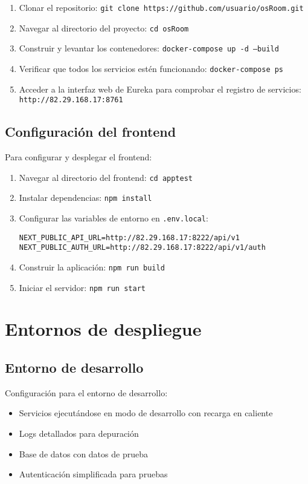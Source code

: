 \documentclass[12pt,a4paper]{report}
\begin{document}
\begin{enumerate}
    \item Clonar el repositorio: \texttt{git clone https://github.com/usuario/osRoom.git}
    \item Navegar al directorio del proyecto: \texttt{cd osRoom}
    \item Construir y levantar los contenedores: \texttt{docker-compose up -d --build}
    \item Verificar que todos los servicios estén funcionando: \texttt{docker-compose ps}
    \item Acceder a la interfaz web de Eureka para comprobar el registro de servicios: \texttt{http://82.29.168.17:8761}
\end{enumerate}

\subsection{Configuración del frontend}
Para configurar y desplegar el frontend:

\begin{enumerate}
    \item Navegar al directorio del frontend: \texttt{cd apptest}
    \item Instalar dependencias: \texttt{npm install}
    \item Configurar las variables de entorno en \texttt{.env.local}:
    \begin{lstlisting}
NEXT_PUBLIC_API_URL=http://82.29.168.17:8222/api/v1
NEXT_PUBLIC_AUTH_URL=http://82.29.168.17:8222/api/v1/auth
    \end{lstlisting}
    \item Construir la aplicación: \texttt{npm run build}
    \item Iniciar el servidor: \texttt{npm run start}
\end{enumerate}

\section{Entornos de despliegue}
\subsection{Entorno de desarrollo}
Configuración para el entorno de desarrollo:

\begin{itemize}
    \item Servicios ejecutándose en modo de desarrollo con recarga en caliente
    \item Logs detallados para depuración
    \item Base de datos con datos de prueba
    \item Autenticación simplificada para pruebas
\end{itemize}
\end{document}
